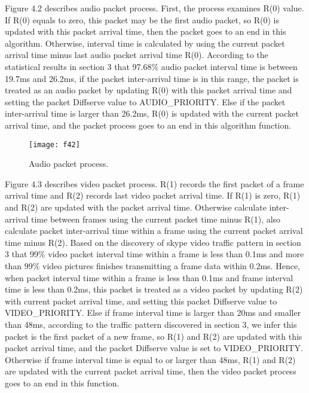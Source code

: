 \documentclass[master]{thesis}
\begin{document}
Figure 4.2 describes audio packet process. First, the process examines R(0) value. If R(0) equals to zero, this packet may be the first audio packet, so R(0) is updated with this packet arrival time, then the packet goes to an end in this algorithm. Otherwise, interval time is calculated by using the current packet arrival time minus last audio packet arrival time R(0). According to the statistical results in section 3 that 97.68\% audio packet interval time is between 19.7ms and 26.2ms, if the packet inter-arrival time is in this range, the packet is treated as an audio packet by updating R(0) with this packet arrival time and setting the packet Diffserve value to AUDIO\_PRIORITY. Else if the packet inter-arrival time is larger than 26.2ms, R(0) is updated with the current packet arrival time, and the packet process goes to an end in this algorithm function. 

\begin{figure}[htp]
    \texttt{[image: f42]}
    \caption[Audio packet process.]{Audio packet process.}
    \label{fig:f42}
\end{figure}

Figure 4.3 describes video packet process. R(1) records the first packet of a frame arrival time and R(2) records last video packet arrival time. If R(1) is zero, R(1) and R(2) are updated with the packet arrival time. Otherwise calculate inter-arrival time between frames using the current packet time minus R(1), also calculate packet inter-arrival time within a frame using the current packet arrival time minus R(2). Based on the discovery of skype video traffic pattern in section 3 that 99\% video packet interval time within a frame is less than 0.1ms and more than 99\% video pictures finishes transmitting a frame data within 0.2ms. Hence, when packet interval time within a frame is less than 0.1ms and frame interval time is less than 0.2ms, this packet is treated as a video packet by updating R(2) with current packet arrival time, and setting this packet Diffserve value to VIDEO\_PRIORITY. Else if frame interval time is larger than 20ms and smaller than 48ms, according to the traffic pattern discovered in section 3, we infer this packet is the first packet of a new frame, so R(1) and R(2) are updated with this packet arrival time, and the packet Diffserve value is set to VIDEO\_PRIORITY. Otherwise if frame interval time is equal to or larger than 48ms, R(1) and R(2) are updated with the current packet arrival time, then the video packet process goes to an end in this function.  
\end{document}
